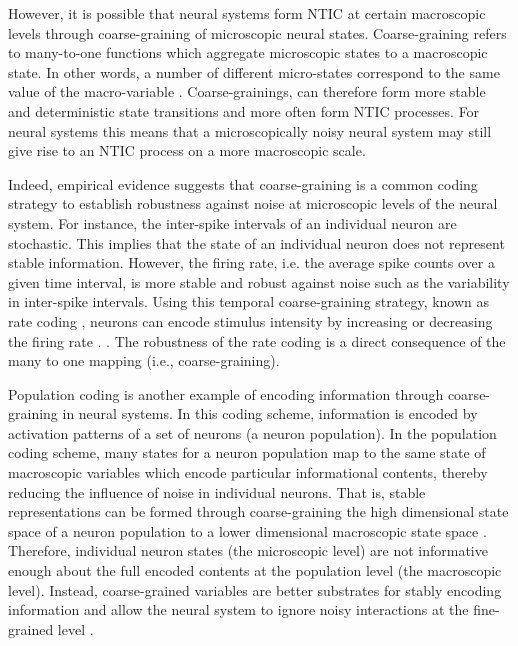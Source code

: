 \documentclass[utf8]{article}
\begin{document}
  
		However, it is possible that neural systems form NTIC at certain macroscopic levels through coarse-graining of microscopic neural states. Coarse-graining refers to many-to-one functions which aggregate microscopic states to a macroscopic state. In other words, a number of different micro-states correspond to the same value of the macro-variable \citep{price2007causation}. Coarse-grainings, can therefore form more stable and deterministic state transitions and more often form NTIC processes. For neural systems this means that a microscopically noisy neural system may still give rise to an NTIC process on a more macroscopic scale.
		
		Indeed, empirical evidence suggests that coarse-graining is a common coding strategy to establish robustness against noise at microscopic levels of the neural system. For instance, the inter-spike intervals of an individual neuron are stochastic. This implies that the state of an individual neuron does not represent stable information. However, the firing rate, i.e. the average spike counts over a given time interval, is more stable and robust against noise such as the variability in inter-spike intervals. Using this temporal coarse-graining strategy, known as rate coding \citep{adrian1926impulses, gerstner2002spiking, maass2001pulsed, panzeri2015neural, stein2005neuronal}, neurons can encode stimulus intensity by increasing or decreasing the firing rate \citep{kandel2000principles}. \citep{stein2005neuronal}. The robustness of the rate coding is a direct consequence of the many to one mapping (i.e., coarse-graining).
		
		Population coding is another example of encoding information through coarse-graining in neural systems. In this coding scheme, information is encoded by activation patterns of a set of neurons (a neuron population). In the population coding scheme, many states for a neuron population map to the same state of macroscopic variables which encode particular informational contents, thereby reducing the influence of noise in individual neurons. That is, stable representations can be formed through coarse-graining the high dimensional state space of a neuron population to a lower dimensional macroscopic state space \citep{kristan1997population, pouget2000information, binder2009encyclopedia, QuianQuiroga2009}. Therefore, individual neuron states (the microscopic level) are not informative enough about the full encoded contents at the population level (the macroscopic level). Instead, coarse-grained variables are better substrates for stably encoding information and allow the neural system to ignore noisy interactions at the fine-grained level \citep{Woodward2007-WOOCWA}.
		
\end{document}

